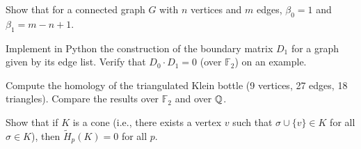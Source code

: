 \begin{exercise}
Show that for a connected graph $G$ with $n$ vertices and $m$ edges,
$\beta_0 = 1$ and $\beta_1 = m - n + 1$.
\end{exercise}

\begin{exercise}
Implement in Python the construction of the boundary matrix $D_1$ for a
graph given by its edge list. Verify that $D_0 \cdot D_1 = 0$ (over
$\mathbb{F}_2$) on an example.
\end{exercise}

\begin{exercise}
Compute the homology of the triangulated Klein bottle (9 vertices, 27
edges, 18 triangles). Compare the results over $\mathbb{F}_2$ and
over $\mathbb{Q}$.
\end{exercise}

\begin{exercise}
Show that if $K$ is a cone (i.e., there exists a vertex $v$ such that
$\sigma \cup \{v\} \in K$ for all $\sigma \in K$), then
$\tilde{H}_p(K) = 0$ for all $p$.
\end{exercise}
